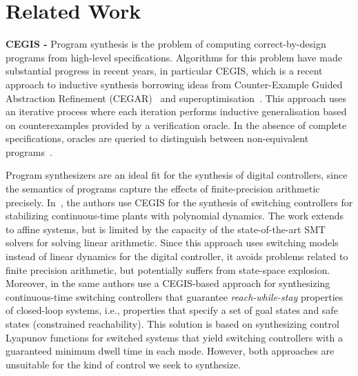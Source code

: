 \documentclass[twocolumn]{autart}    %
\begin{document}
\section{Related Work}
\label{sec:relw}

\textbf{CEGIS -} Program synthesis is the problem of computing
correct-by-design programs from high-level specifications. Algorithms
for this problem have made substantial progress in recent years, in
particular CEGIS, which is a recent approach to inductive synthesis
borrowing ideas from Counter-Example Guided Abstraction Refinement
(CEGAR)~\cite{DBLP:conf/cav/ClarkeGJLV00} and
superoptimisation~\cite{DBLP:conf/iclp/BrainCVF06,
  DBLP:conf/asplos/Massalin87}.  This approach uses an iterative
process where each iteration performs inductive generalisation based
on counterexamples provided by a verification oracle.  In the absence
of complete specifications, oracles are queried to distinguish between
non-equivalent
programs~\cite{jha-icse10,DBLP:conf/fmcad/AlurBJMRSSSTU13}.


Program synthesizers are an ideal fit for the synthesis of digital controllers, since
the semantics of programs capture the effects of finite-precision arithmetic
precisely.  In~\cite{DBLP:conf/cdc/RavanbakhshS15}, the authors use CEGIS
for the synthesis of switching controllers for stabilizing continuous-time
plants with polynomial dynamics.  The work extends to affine systems, but is
limited by the capacity of the state-of-the-art SMT solvers for solving
linear arithmetic.  Since this approach uses switching models instead of
linear dynamics for the digital controller, it avoids problems related to
finite precision arithmetic, but potentially suffers from state-space
explosion.  Moreover, in \cite{DBLP:conf/emsoft/RavanbakhshS16} the same
authors use a CEGIS-based approach for synthesizing continuous-time
switching controllers that guarantee \emph{reach-while-stay} properties of
closed-loop systems, i.e., properties that specify a set of goal states and
safe states (constrained reachability).  This solution is based on
synthesizing control Lyapunov functions for switched systems that yield
switching controllers with a guaranteed minimum dwell time in each mode. 
However, both approaches are unsuitable for the kind of control we seek to
synthesize.
\end{document}
